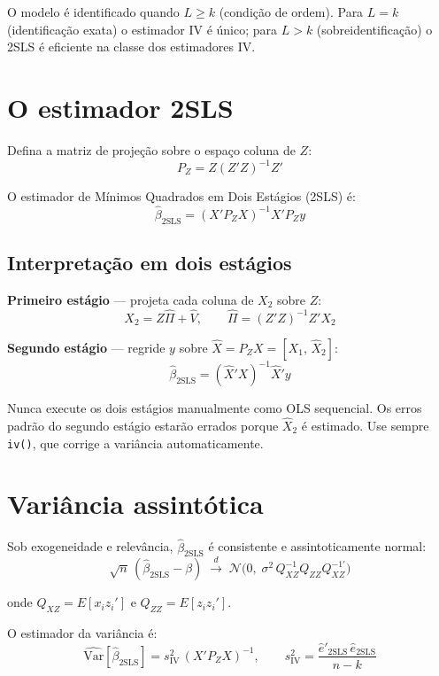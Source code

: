 O modelo é identificado quando $L \geq k$ (condição de ordem). Para
$L = k$ (identificação exata) o estimador IV é único; para $L > k$
(sobreidentificação) o 2SLS é eficiente na classe dos estimadores IV.

\section{O estimador 2SLS}

Defina a matriz de projeção sobre o espaço coluna de $Z$:
\[
  P_Z = Z(Z'Z)^{-1}Z'
\]

O estimador de Mínimos Quadrados em Dois Estágios (2SLS) é:
\[
  \boxed{\hat{\beta}_{\mathrm{2SLS}} = (X'P_Z X)^{-1} X'P_Z y}
\]

\subsection*{Interpretação em dois estágios}

\textbf{Primeiro estágio} — projeta cada coluna de $X_2$ sobre $Z$:
\[
  X_2 = Z\hat{\Pi} + \hat{V}, \qquad \hat{\Pi} = (Z'Z)^{-1}Z'X_2
\]

\textbf{Segundo estágio} — regride $y$ sobre $\hat{X} = P_Z X = [X_1,\, \hat{X}_2]$:
\[
  \hat{\beta}_{\mathrm{2SLS}} = (\hat{X}'X)^{-1}\hat{X}'y
\]

\begin{aviso}
  Nunca execute os dois estágios manualmente como OLS sequencial. Os erros
  padrão do segundo estágio estarão errados porque $\hat{X}_2$ é estimado.
  Use sempre \lstinline{iv()}, que corrige a variância automaticamente.
\end{aviso}

\section{Variância assintótica}

Sob exogeneidade e relevância, $\hat{\beta}_{\mathrm{2SLS}}$ é consistente e
assintoticamente normal:
\[
  \sqrt{n}\,(\hat{\beta}_{\mathrm{2SLS}} - \beta)
  \;\xrightarrow{d}\;
  \mathcal{N}\!\bigl(0,\; \sigma^2 \,Q_{XZ}^{-1} Q_{ZZ} Q_{XZ}^{-1\prime}\bigr)
\]

onde $Q_{XZ} = E[x_i z_i']$ e $Q_{ZZ} = E[z_i z_i']$.

O estimador da variância é:
\[
  \widehat{\mathrm{Var}}[\hat{\beta}_{\mathrm{2SLS}}]
  = s^2_{\mathrm{IV}}\,(X'P_Z X)^{-1},
  \qquad
  s^2_{\mathrm{IV}} = \frac{\hat{e}'_{\mathrm{2SLS}}\,\hat{e}_{\mathrm{2SLS}}}{n - k}
\]

